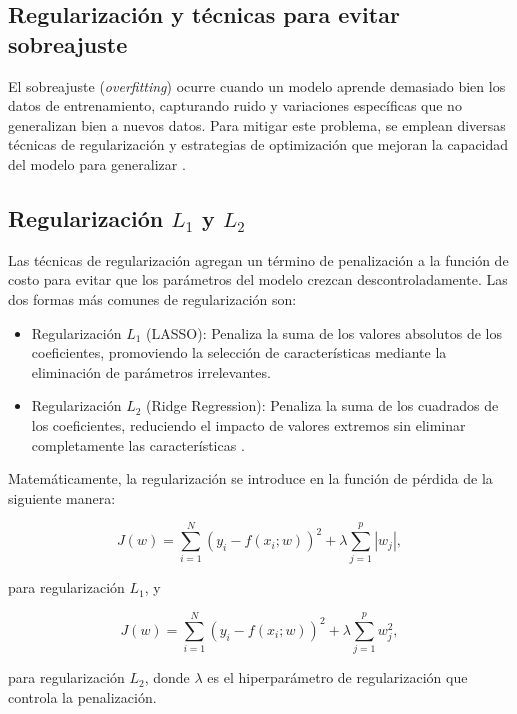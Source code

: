 \begin{itemize}
		\section{Regularización y técnicas para evitar sobreajuste}
		
		El sobreajuste (\textit{overfitting}) ocurre cuando un modelo aprende demasiado bien los datos de entrenamiento, capturando ruido y variaciones específicas que no generalizan bien a nuevos datos. Para mitigar este problema, se emplean diversas técnicas de regularización y estrategias de optimización que mejoran la capacidad del modelo para generalizar \cite{goodfellow2016deep}.
		
		\subsection{Regularización \(L_1\) y \(L_2\)}
		
		Las técnicas de regularización agregan un término de penalización a la función de costo para evitar que los parámetros del modelo crezcan descontroladamente. Las dos formas más comunes de regularización son:
		
		\begin{itemize}
			\item Regularización \(L_1\) (LASSO): Penaliza la suma de los valores absolutos de los coeficientes, promoviendo la selección de características mediante la eliminación de parámetros irrelevantes.
			\item Regularización \(L_2\) (Ridge Regression): Penaliza la suma de los cuadrados de los coeficientes, reduciendo el impacto de valores extremos sin eliminar completamente las características \cite{tibshirani1996regression}.
		\end{itemize}
		
		Matemáticamente, la regularización se introduce en la función de pérdida de la siguiente manera:
		
		\begin{equation}
			J(w) = \sum_{i=1}^{N} \left(y_i - f(x_i; w) \right)^2 + \lambda \sum_{j=1}^{p} |w_j|,
		\end{equation}
		
		para regularización \(L_1\), y
		
		\begin{equation}
			J(w) = \sum_{i=1}^{N} \left(y_i - f(x_i; w) \right)^2 + \lambda \sum_{j=1}^{p} w_j^2,
		\end{equation}
		
		para regularización \(L_2\), donde \(\lambda\) es el hiperparámetro de regularización que controla la penalización.
		

\end{itemize}
